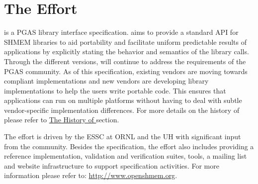 \section{The \openshmem Effort}

\openshmem is a \ac{PGAS} library interface specification. \openshmem aims to provide a standard \ac{API} for SHMEM libraries to aid portability and facilitate uniform predictable results of \openshmem applications by explicitly stating the behavior and semantics of the \openshmem library calls. Through the different versions, \openshmem will continue to address the requirements of the \ac{PGAS} community. 
As of this specification, existing vendors are moving towards \openshmem compliant implementations and new vendors are developing \openshmem library implementations to help the users write portable \openshmem code. This ensures that applications can run on multiple platforms without having to deal with subtle vendor-specific implementation differences. For more details on the history of 
\openshmem please refer to \hyperref[sec:openshmem_history]{The History of \openshmem} section.  

The \openshmem effort is driven by the \ac{ESSC} at \ac{ORNL} and the \ac{UH} 
with significant input from the \openshmem{} community. Besides the
specification, the effort also includes providing a reference \openshmem implementation,
validation and verification suites, tools, a mailing list and website infrastructure to support
specification activities. For more information please refer to: \url{http://www.openshmem.org}.
